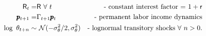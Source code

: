 \begin{eqnarray}
   \mathsf{R}_{t}   = & \mathsf{R}~\forall~t & \text{- constant interest factor = $1+\mathsf{r}$}  \notag
\\ \pmb{p}_{t+1}  = & \Gamma_{t+1}\pmb{p}_{t} &   \text{- permanent labor income dynamics} \label{eq:permincgrow}
\\ \log ~ \theta_{t+n} \sim &  ~\mathcal{N}(-\sigma_{\theta}^{2}/2,\sigma_{\theta}^{2}) & \text{- lognormal transitory shocks}~\forall~n>0 \notag
\label{eq:epsdist}
.
\end{eqnarray}

